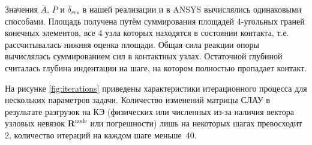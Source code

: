 \documentclass[]{article}
\begin{document}
Значения $\bar{A}$, $\bar{P}$ и $\bar{\delta}_{res}$ в нашей реализации и в ANSYS вычислялись одинаковыми способами. Площадь получена путём суммирования площадей 4-угольных граней конечных элементов, все 4 узла которых находятся в состоянии контакта, т.е. рассчитывалась нижняя оценка площади. Общая сила реакции опоры вычислялась суммированием сил в контактных узлах. Остаточной глубиной считалась глубина индентации на шаге, на котором полностью пропадает контакт.

На рисунке \ref{fig:iterations} приведены характеристики итерационного процесса для нескольких параметров задачи. Количество изменений матрицы СЛАУ в результате разгрузок на КЭ (физических или численных из-за наличия вектора узловых невязок $\mathbf{R}^{\mathrm{node}}$ или погрешности) лишь на некоторых шагах превосходит 2, количество итераций на каждом шаге \mbox{меньше 40}. 
\end{document}
